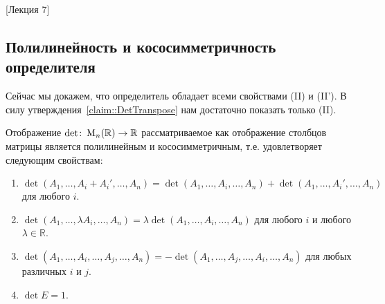 [Лекция 7]


\subsection{Полилинейность и кососимметричность определителя}

Сейчас мы докажем, что определитель обладает всеми свойствами (II) и (II').
В силу утверждения~\ref{claim::DetTranspose} нам достаточно показать только (II).

\begin{claim}
\label{claim::DetPolyAnti}
Отображение $\det\colon \operatorname{M}_{n}(\mathbb R)\to \mathbb R$ рассматриваемое как отображение столбцов матрицы является полилинейным и кососимметричным, т.е. удовлетворяет следующим свойствам:
\begin{enumerate}
\item $\det(A_1,\ldots, A_i + A_i', \ldots, A_n) = \det(A_1,\ldots, A_i, \ldots, A_n) + \det(A_1,\ldots,A_i', \ldots, A_n)$ для любого $i$.

\item $\det(A_1,\ldots, \lambda A_i, \ldots, A_n) = \lambda \det(A_1,\ldots, A_i, \ldots, A_n)$ для любого $i$ и любого $\lambda\in\mathbb R$.

\item $\det(A_1,\ldots, A_i, \ldots, A_j, \ldots, A_n) = -\det(A_1,\ldots, A_j, \ldots, A_i, \ldots, A_n)$ для любых различных $i$ и $j$.

\item $\det E = 1$.
\end{enumerate}
\end{claim}
